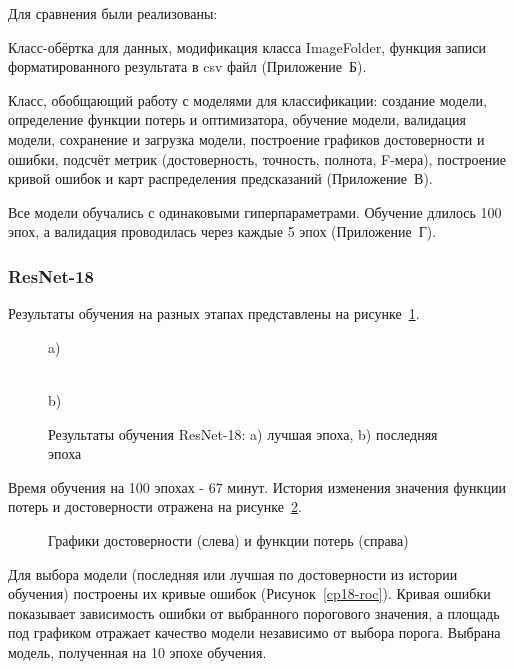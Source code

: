 Для сравнения были реализованы: 
\begin{itemize*}
	\item Класс-обёртка для данных, модификация класса ImageFolder, функция записи форматированного результата в csv файл (Приложение~Б).
	\item Класс, обобщающий работу с моделями для классификации: создание модели, определение функции потерь и оптимизатора, обучение модели, валидация модели, сохранение и загрузка модели, построение графиков достоверности и ошибки, подсчёт метрик (достоверность, точность, полнота, F-мера), построение кривой ошибок и карт распределения предсказаний (Приложение~В).
\end{itemize*}
Все модели обучались с одинаковыми гиперпараметрами. Обучение длилось 100 эпох, а валидация проводилась через каждые 5 эпох (Приложение~Г). 

\subsubsection{ResNet-18}
Результаты обучения на разных этапах представлены на рисунке~\ref{cp18epoch}.

\begin{figure}[H]
	\begin{minipage}[h]{0.52\linewidth}
		\center{\texttt{[image: cp18-1]}} a) \\
	\end{minipage}
	\hfill
	\begin{minipage}[h]{0.46\linewidth}
		\center{\texttt{[image: cp18-100]}} \\b)
	\end{minipage}
	\caption{Результаты обучения ResNet-18: a) лучшая эпоха, b)
		последняя эпоха}
	\label{cp18epoch}
\end{figure}

Время обучения на 100 эпохах - $67$ минут. История изменения значения функции потерь и достоверности отражена на рисунке~\ref{cp18-loss}. 

\begin{figure}[H]
	\caption{Графики достоверности (слева) и функции потерь (справа)} 
	\label{cp18-loss} 
\end{figure}

Для выбора модели (последняя или лучшая по достоверности из истории обучения) построены их кривые ошибок (Рисунок~\ref{cp18-roc}). Кривая ошибки показывает зависимость ошибки от выбранного порогового значения, а площадь под графиком отражает качество модели независимо от выбора порога. Выбрана модель, полученная на 10 эпохе обучения.

